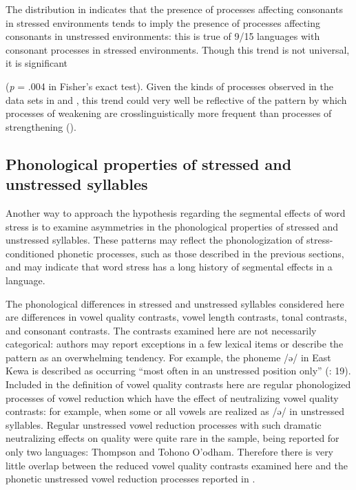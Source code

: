   The distribution in  indicates that the presence of processes affecting consonants in stressed environments tends to imply the presence of processes affecting consonants in unstressed environments: this is true of 9/15 languages with consonant processes in stressed environments. Though this trend is not universal, it is significant 

(\textit{p} = .004 in Fisher’s exact test). Given the kinds of processes observed in the data sets in  and , this trend could very well be reflective of the pattern by which processes of weakening are crosslinguistically more frequent than processes of strengthening (\citealt{BybeeEasterday2019,Bybee2015b,Lavoie2015}).

\subsection{Phonological properties of stressed and unstressed syllables}\label{sec:5.4.4}

  Another way to approach the hypothesis regarding the segmental effects of word stress is to examine asymmetries in the phonological properties of stressed and unstressed syllables. These patterns may reflect the phonologization of stress-conditioned phonetic processes, such as those described in the previous sections, and may indicate that word stress has a long history of segmental effects in a language.

  The phonological differences in stressed and unstressed syllables considered here are differences in vowel quality contrasts, vowel length contrasts, tonal contrasts, and consonant contrasts. The contrasts examined here are not necessarily categorical: authors may report exceptions in a few lexical items or describe the pattern as an overwhelming tendency. For example, the phoneme /ə/ in East Kewa is described as occurring “most often in an unstressed position only” (\citealt{FranklinFranklin1978}: 19). Included in the definition of vowel quality contrasts here are regular phonologized processes of vowel reduction which have the effect of neutralizing vowel quality contrasts: for example, when some or all vowels are realized as /ə/ in unstressed syllables. Regular unstressed vowel reduction processes with such dramatic neutralizing effects on quality were quite rare in the sample, being reported for only two languages: Thompson and Tohono O’odham. Therefore there is very little overlap between the reduced vowel quality contrasts examined here and the phonetic unstressed vowel reduction processes reported in .

